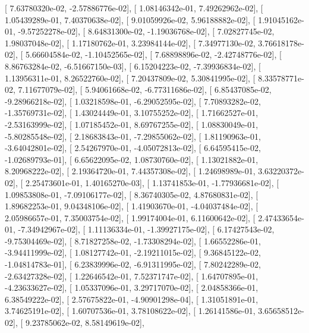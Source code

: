 \documentclass{article}
\begin{document}
       [  7.63780320e-02,  -2.57886776e-02],
       [  1.08146342e-01,   7.49262962e-02],
       [  1.05439289e-01,   7.40370638e-02],
       [  9.01059926e-02,   5.96188882e-02],
       [  1.91045162e-01,  -9.57252278e-02],
       [  8.64831300e-02,  -1.19036768e-02],
       [  7.02827745e-02,   1.98037048e-02],
       [  1.17180762e-01,   3.23984144e-02],
       [  7.34977130e-02,   3.76618178e-02],
       [  5.66604584e-02,  -1.10452565e-02],
       [  7.68898896e-02,  -2.42748776e-02],
       [  8.86763284e-02,  -6.51667150e-03],
       [  6.15204223e-02,  -7.39936834e-02],
       [  1.13956311e-01,   8.26522760e-02],
       [  7.20437809e-02,   5.30841995e-02],
       [  8.33578771e-02,   7.11677079e-02],
       [  5.94061668e-02,  -6.77311686e-02],
       [  6.85437085e-02,  -9.28966218e-02],
       [  1.03218598e-01,  -6.29052595e-02],
       [  7.70893282e-02,  -1.35769731e-02],
       [  1.43024449e-01,   3.10755252e-02],
       [  1.71662527e-01,  -2.53163999e-02],
       [  1.07185452e-01,   8.69767255e-02],
       [  1.08830049e-01,  -5.80285548e-02],
       [  2.18683843e-01,  -7.29855062e-02],
       [  1.81190963e-01,  -3.64042801e-02],
       [  2.54267970e-01,  -4.05072813e-02],
       [  6.64595415e-02,  -1.02689793e-01],
       [  6.65622095e-02,   1.08730760e-02],
       [  1.13021882e-01,   8.20968222e-02],
       [  2.19364720e-01,   7.44357308e-02],
       [  1.24698989e-01,   3.63220372e-02],
       [  2.25473601e-01,   1.40165270e-03],
       [  1.13741853e-01,  -1.77936681e-02],
       [  1.09853808e-01,  -7.09106177e-02],
       [  8.36740305e-02,   4.87680831e-02],
       [  1.89682253e-01,   9.04348106e-02],
       [  1.41903670e-01,  -4.04037484e-02],
       [  2.05986657e-01,   7.35003754e-02],
       [  1.99174004e-01,   6.11600642e-02],
       [  2.47433654e-01,  -7.34942967e-02],
       [  1.11136334e-01,  -1.39927175e-02],
       [  6.17427543e-02,  -9.75304469e-02],
       [  8.71827258e-02,  -1.73308294e-02],
       [  1.66552286e-01,  -3.94411999e-02],
       [  1.08127742e-01,  -2.19211015e-02],
       [  9.36845122e-02,  -1.04814783e-01],
       [  6.23839996e-02,  -6.91311995e-02],
       [  7.80242289e-02,  -2.63427328e-02],
       [  1.22646542e-01,   7.52371747e-02],
       [  1.64707895e-01,  -4.23633627e-02],
       [  1.05337096e-01,   3.29717070e-02],
       [  2.04858366e-01,   6.38549222e-02],
       [  2.57675822e-01,  -4.90901298e-04],
       [  1.31051891e-01,   3.74625191e-02],
       [  1.60707536e-01,   3.78108622e-02],
       [  1.26141586e-01,   3.65658512e-02],
       [  9.23785062e-02,   8.58149619e-02],
\end{document}
